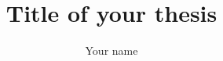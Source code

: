 \documentclass[fontsize=11pt, %
			   chapterprefix=true,
			   setPDF, %
			   bibstyle=styleB,
			   ]{fau-math-thesis}
\title{Title of your thesis}
\author{Your name}
\begin{document}
\frontmatter
\maketitle
\printdedication
\printacknowledgement
\tableofcontents
\listoffigures
\printnomenclature
\mainmatter



\backmatter

\printindex
\end{document}
